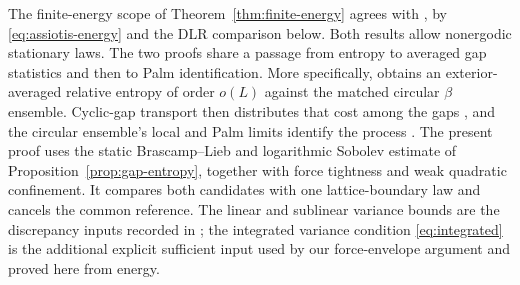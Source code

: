 \documentclass[11pt,reqno]{amsart}
\numberwithin{equation}{section}
\theoremstyle{definition}
\theoremstyle{remark}
\newcommand{\1}{\mathbf 1}
\begin{document}
The finite-energy scope of Theorem~\ref{thm:finite-energy} agrees with
\cite[Theorem~1.1]{Assiotis}, by \eqref{eq:assiotis-energy} and the
DLR comparison below. Both results allow nonergodic stationary laws.
The two proofs share a passage from entropy to averaged gap statistics
and then to Palm identification. More specifically,
\cite[Proposition~7.3]{Assiotis} obtains an exterior-averaged relative
entropy of order $o(L)$ against the matched circular $\beta$ ensemble.
Cyclic-gap transport then distributes that cost among the gaps
\cite[Lemma~8.3]{Assiotis}, and the circular ensemble's local and Palm
limits identify the process \cite[Sections~8.3--8.6]{Assiotis}.
The present proof uses the static Brascamp--Lieb and logarithmic Sobolev
estimate of Proposition~\ref{prop:gap-entropy}, together with force
tightness and weak quadratic confinement. It compares both candidates
with one lattice-boundary law and cancels the common reference.
The linear and sublinear variance bounds are the discrepancy inputs
recorded in \cite[Proposition~2.7]{Assiotis}; the integrated variance
condition \eqref{eq:integrated} is the additional explicit sufficient
input used by our force-envelope argument and proved here from energy.
\end{document}
